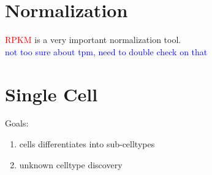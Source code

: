 \documentclass[font=12pt]{article}
\begin{document}
\medskip

\section{Normalization}
\textcolor{red}{RPKM} is a very important normalization tool.\\
\textcolor{blue}{not too sure about tpm, need to double check on that}

\section{Single Cell}
Goals:
\begin{enumerate}
	\item cells differentiates into sub-celltypes
	\item unknown celltype discovery
\end{enumerate}
\end{document}
